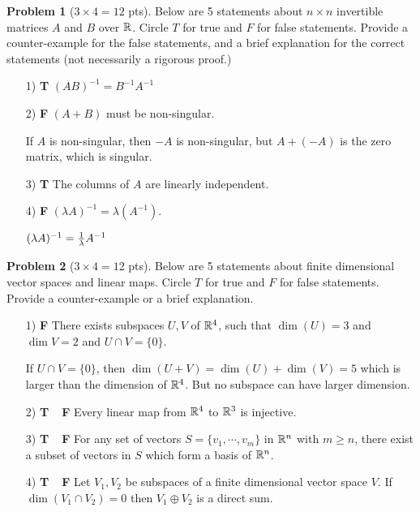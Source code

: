 \documentclass[12pt]{amsart}
\theoremstyle{definition}
\newtheorem{prob}{Problem}
\newcommand{\blu}[1]{{\color{blue}#1}}
\begin{document}
\begin{prob}[$3\times 4 = 12$ pts]
	Below are 5 statements about $n\times n$ invertible matrices $A$ and $B$ over $\mathbb{R}$. Circle $T$ for true and $F$ for false statements. Provide a counter-example for the false statements, and a brief explanation for the correct statements (not necessarily a rigorous proof.) \begin{enumerate}
	\item[1)  {\bf T}]\quad $(AB)^{-1}=B^{-1}A^{-1}$
	
	\item[2)  {\bf F}]\quad  $(A+B)$ must be non-singular.
	
\blu{If $A$ is non-singular, then $-A$ is non-singular, but $A+(-A)$ is the zero matrix, which is singular.}
		\item[3)  {\bf T}]\quad The columns of $A$ are linearly independent.

	\item[4)  {\bf F}]\quad $(\lambda A)^{-1}=\lambda (A^{-1})$.
	
	\blu{$ (\lambda A)^{-1}={1\over\lambda}A^{-1}$}
\end{enumerate}
\end{prob}

\begin{prob}[$3\times 4 = 12$ pts]
	Below are 5 statements about finite dimensional vector spaces and linear maps. Circle $T$ for true and $F$ for false statements. Provide a counter-example or a brief explanation.
	\begin{enumerate}
		\item[1)  {\bf F}]\quad There exists subspaces $U,V$ of $\mathbb{R}^4$, such that $\dim(U)=3$ and $\dim V=2$ and $U\cap V=\{0\}$. 
		
		\blu{If $U\cap V=\{0\}$, then $\dim(U+V)=\dim(U)+\dim(V)=5$ which is larger than the dimension of $\mathbb{R}^4$. But no subspace can have larger dimension.}
\item[2)  {\bf T\ \  F}]\quad  Every linear map from $\mathbb{R}^4$ to $\mathbb{R}^3$ is injective.

\blu{ }
\item[3)  {\bf T\ \  F}]\quad  For any set of vectors $S=\{v_1,\cdots,v_m\}$ in $\mathbb{R}^n$ with $m\geq n$, there exist a subset of vectors in $S$ which form a basis of $\mathbb{R}^n$.\vspace{5cm}
\item[4)  {\bf T\ \  F}]\quad  Let $V_1,V_2$ be subspaces of a finite dimensional vector space $V$. If $\dim(V_1\cap V_2)=0$ then $V_1\oplus V_2$ is a direct sum.
	\end{enumerate}
\end{prob}
\newpage
\end{document}
